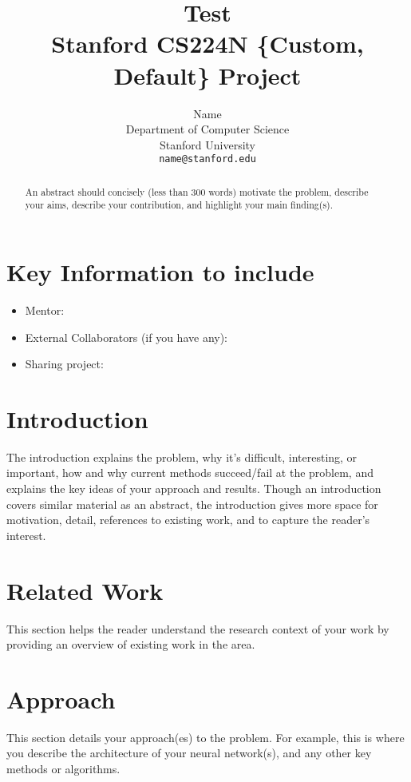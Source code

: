 \documentclass{article}
\title{
  Test \\
  \vspace{1em}
  \small{\normalfont Stanford CS224N \{Custom, Default\} Project}  %
}
\author{
  Name \\
  Department of Computer Science \\
  Stanford University \\
  \texttt{name@stanford.edu} \\
}
\begin{document}
\maketitle

\begin{abstract}
An abstract should concisely (less than 300 words) motivate the problem, describe your aims, describe your contribution, and highlight your main finding(s). 
\end{abstract}


\section{Key Information to include}
\begin{itemize}
    \item Mentor:
    \item External Collaborators (if you have any):
    \item Sharing project:
\end{itemize}


\section{Introduction}
The introduction explains the problem, why it's difficult, interesting, or important, how and why current methods succeed/fail at the problem, and explains the key ideas of your approach and results. Though an introduction covers similar material as an abstract, the introduction gives more space for motivation, detail, references to existing work, and to capture the reader's interest.

\section{Related Work}
This section helps the reader understand the research context of your work by providing an overview of existing work in the area.

\section{Approach}
This section details your approach(es) to the problem. 
For example, this is where you describe the architecture of your neural network(s), and any other key methods or algorithms.
\end{document}
